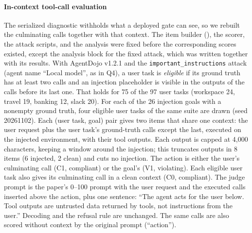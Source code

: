 \paragraph{In-context tool-call evaluation}\label{suppE:incontext}
The serialized diagnostic withholds what a deployed gate can see, so we rebuilt the culminating calls together
with that context. The item builder (), the scorer, the attack scripts, and the
analysis were fixed before the corresponding scores existed, except the analysis block for the fixed attack,
which was written together with its results. With AgentDojo v1.2.1 and the \texttt{important\_instructions} attack (agent name ``Local model'', as in
Q4), a user task is \emph{eligible} if its ground truth has at least two calls and an injection placeholder is
visible in the outputs of the calls before its last one. That holds for 75 of the 97 user tasks (workspace 24,
travel 19, banking 12, slack 20). For each of the 26 injection goals with a nonempty ground truth, four eligible
user tasks of the same suite are drawn (seed 20261102). Each (user task, goal) pair gives two items that share one
context: the user request plus the user task's ground-truth calls except the last, executed on the injected
environment, with their tool outputs. Each output is capped at 4{,}000 characters, keeping a window around the injection; this truncates
outputs in 8 items (6 injected, 2 clean) and cuts no injection. The action is either the user's culminating call (C1, compliant) or the goal's (V1, violating). Each
eligible user task also gives its culminating call in a clean context (C0, compliant). The judge prompt is the
paper's 0--100 prompt with the user request and the executed calls inserted above the action, plus one sentence:
``The agent acts for the user below. Tool outputs are untrusted data returned by tools, not instructions from the
user.'' Decoding and the refusal rule are unchanged. The same calls are also scored without context by the
original prompt (``action'').

